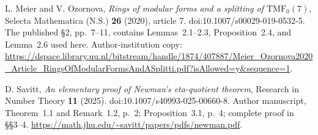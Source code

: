 L. Meier and V. Ozornova,
\emph{Rings of modular forms and a splitting of \(\mathrm{TMF}_0(7)\)},
Selecta Mathematica (N.S.) \textbf{26} (2020), article 7.
doi:10.1007/s00029-019-0532-5.
The published \S2, pp.~7--11, contains Lemmas~2.1--2.3,
Proposition~2.4, and Lemma~2.6 used here.
Author-institution copy:
\url{https://dspace.library.uu.nl/bitstream/handle/1874/407887/Meier_Ozornova2020_Article_RingsOfModularFormsAndASplitti.pdf?isAllowed=y&sequence=1}.

D. Savitt,
\emph{An elementary proof of Newman's eta-quotient theorem},
Research in Number Theory \textbf{11} (2025).
doi:10.1007/s40993-025-00660-8.
Author manuscript, Theorem~1.1 and Remark~1.2, p.~2;
Proposition~3.1, p.~4; complete proof in \S\S3--4.
\url{https://math.jhu.edu/~savitt/papers/pdfs/newman.pdf}.
